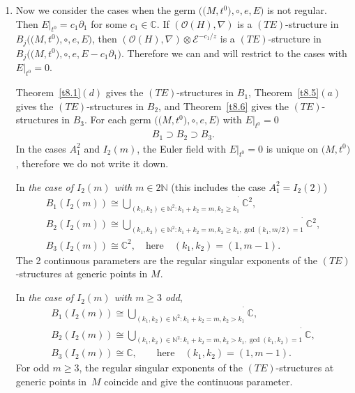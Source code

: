 \documentclass[10pt,a4paper]{amsart}
\numberwithin{equation}{section}
\numberwithin{figure}{section}
\newcommand{\N}{{\mathbb N}}
\newcommand{\C}{{\mathbb C}}
\newcommand{\EE}{{\mathcal E}}
\newcommand{\OO}{{\mathcal O}}
\newcommand{\paa}{\partial}
\newcommand{\nnn}{\nabla}
\begin{document}
\begin{Remarks}
\begin{enumerate}
Corollary~\ref{t4.18} gives the countably many components
for type (Reg). One is 1-dimensional, the others are
2-dimensional.

\item[$(ii)$] Now we consider the cases when the germ
$\big(\big(M,t^0\big),\circ,e,E\big)$ is not regular.
Then $E|_{t^0}=c_1\paa_1$ for some $c_1\in\C$.
If $(\OO(H),\nnn)$ is a $(TE)$-structure in
$B_j\big(\big(M,t^0\big),\circ,e,E\big)$, then
$(\OO(H),\nnn)\otimes \EE^{-c_1/z}$ is a $(TE)$-structure in
$B_j\big(\big(M,t^0\big),\circ,e,E-c_1\paa_1\big)$.
Therefore we can and will restrict to the cases with
$E|_{t^0}=0$.

Theorem~\ref{t8.1}$(d)$ gives the $(TE)$-structures in $B_1$,
Theorem~\ref{t8.5}$(a)$ gives the $(TE)$-structures in $B_2$,
and Theorem~\ref{t8.6} gives the $(TE)$-structures in $B_3$.
For each germ $\big(\big(M,t^0\big),\circ,e,E\big)$ with $E|_{t^0}=0$
\begin{gather*}%
B_1\supset B_2\supset B_3.
\end{gather*}
In the cases $A_1^2$ and $I_2(m)$, the Euler field with
$E|_{t^0}=0$ is unique on $\big(M,t^0\big)$, therefore we do not
write it down.

In {\it the case of $I_2(m)$ with $m\in 2\N$} (this includes
the case $A_1^2=I_2(2)$)
\begin{gather}
B_1(I_2(m))\cong \dot{\bigcup\limits_{(k_1,k_2)\in\N^2\colon
k_1+k_2=m,k_2\geq k_1}}\C^2,\nonumber
\\
B_2(I_2(m))\cong \dot{\bigcup\limits_{(k_1,k_2)\in\N^2\colon
k_1+k_2=m,k_2\geq k_1,\gcd(k_1,m/2)=1}}\C^2, \nonumber
\\
B_3(I_2(m))\cong \C^2,\quad\text{here}\quad(k_1,k_2)=(1,m-1).
\label{8.17}
\end{gather}
The 2 continuous parameters are the regular singular exponents of the
$(TE)$-structures at generic points in $M$.

In {\it the case of $I_2(m)$ with $m\geq 3$ odd},
\begin{gather}
B_1(I_2(m))\cong \dot{\bigcup\limits_{(k_1,k_2)\in\N^2\colon
k_1+k_2=m,k_2>k_1}}\C,\nonumber
\\
B_2(I_2(m))\cong \dot{\bigcup\limits_{(k_1,k_2)\in\N^2\colon
k_1+k_2=m,k_2>k_1,\gcd(k_1,k_2)=1}}\C, \nonumber
\\
B_3(I_2(m))\cong\C, \qquad\text{here}\quad (k_1,k_2)=(1,m-1).
\label{8.18}
\end{gather}
For odd $m\geq 3$, the regular singular exponents of the
$(TE)$-structures at generic points in~$M$ coincide and
give the continuous parameter.


\end{enumerate}
\end{Remarks}
\end{document}
